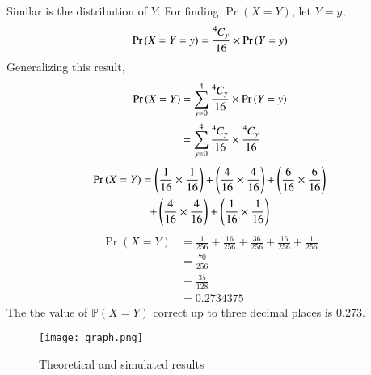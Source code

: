 \documentclass[journal,12pt,twocolumn]{IEEEtran}
\begin{document}
Similar is the distribution of $Y$. For finding $\Pr{(X=Y)}$, let $Y=y$,
\begin{align}
    \Pr{(X=Y=y)} = \frac{\comb[4]{y}}{16} \times \Pr{(Y=y)}
\end{align}
Generalizing this result,
\begin{align}
    \Pr{(X=Y)} &= \sum_{y=0}^4  \frac{\comb[4]{y}}{16}\times \Pr{(Y=y)}
    \\ &= \sum_{y=0}^4 \frac{\comb[4]{y}}{16} \times \frac{\comb[4]{y}}{16}
\end{align}
\begin{multline}
    \Pr{(X=Y)} = \brak{\frac{1}{16}\times\frac{1}{16}} + \brak{\frac{4}{16}\times\frac{4}{16}} +\brak{\frac{6}{16}\times\frac{6}{16}} \\+\brak{\frac{4}{16}\times\frac{4}{16}} +\brak{\frac{1}{16}\times\frac{1}{16}} 
\end{multline}
\begin{align}
    \Pr{(X=Y)} &= \frac{1}{256} + \frac{16}{256} +\frac{36}{256} +\frac{16}{256} +\frac{1}{256} 
    \\&= \frac{70}{256} 
    \\&= \frac{35}{128} 
    \\&= 0.2734375
\end{align}
The the value of $\mathbb{P}(X=Y)$ correct up to three decimal places is 0.273.
\begin{figure} [H]
    \texttt{[image: graph.png]}
    \caption{Theoretical and simulated results}
    \label{Fig 1}
\end{figure}
\end{document}
